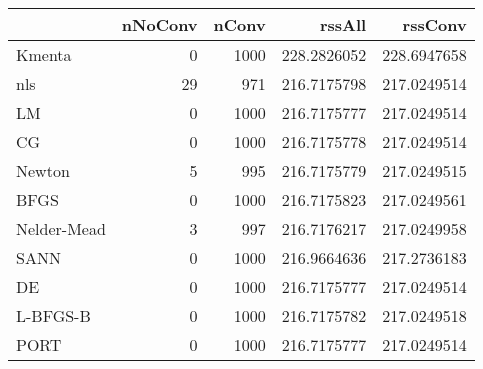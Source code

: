 \begin{tabular}{lrrrr}
  \hline
 & nNoConv & nConv & rssAll & rssConv \\ 
  \hline
Kmenta & 0 & 1000 & 228.2826052 & 228.6947658 \\ 
  nls & 29 & 971 & 216.7175798 & 217.0249514 \\ 
  LM & 0 & 1000 & 216.7175777 & 217.0249514 \\ 
  CG & 0 & 1000 & 216.7175778 & 217.0249514 \\ 
  Newton & 5 & 995 & 216.7175779 & 217.0249515 \\ 
  BFGS & 0 & 1000 & 216.7175823 & 217.0249561 \\ 
  Nelder-Mead & 3 & 997 & 216.7176217 & 217.0249958 \\ 
  SANN & 0 & 1000 & 216.9664636 & 217.2736183 \\ 
  DE & 0 & 1000 & 216.7175777 & 217.0249514 \\ 
  L-BFGS-B & 0 & 1000 & 216.7175782 & 217.0249518 \\ 
  PORT & 0 & 1000 & 216.7175777 & 217.0249514 \\ 
   \hline
\end{tabular}
